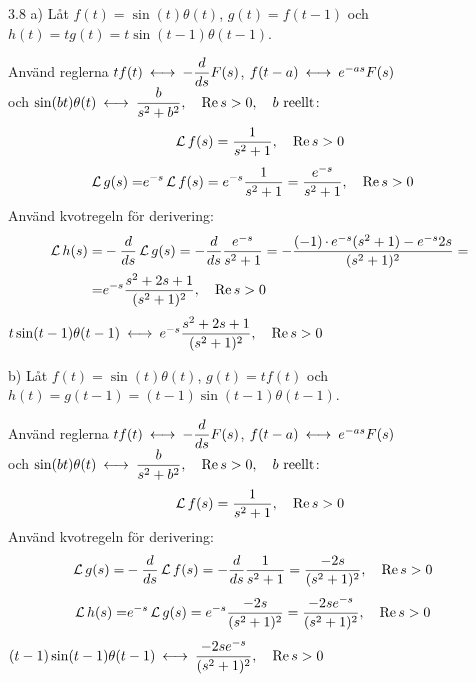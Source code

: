 \begin{task}{3.8 a)}
	Låt $f(t)=\sin(t)\theta(t)$, $g(t)=f(t-1)$ och $h(t)=tg(t)=t\sin(t-1)\theta(t-1)$.
	
	Använd reglerna $tf(t) \llra -\dfrac{d}{ds}F(s)$, $f(t-a)\llra e^{-as}F(s)$ \\
	och $\sin(bt)\theta(t)\llra\dfrac{b}{s^2+b^2}\cond{\Re s > 0}\cond{b\text{ reellt}}$:
	\[\operatorname{\mathcal{L}} f(s)=\frac{1}{s^2+1}, \quad \operatorname{Re} s > 0\]
	\begin{align*}
	\operatorname{\mathcal{L}} g(s)=
	&e^{-s}\operatorname{\mathcal{L}} f(s)=
	e^{-s}\frac{1}{s^2+1}=
	\frac{e^{-s}}{s^2+1}, \quad \operatorname{Re} s > 0
	\end{align*}
	Använd kvotregeln för derivering:
	\begin{align*}
	\operatorname{\mathcal{L}} h(s)=
	&-\frac{d}{ds}\operatorname{\mathcal{L}} g(s)=
	-\frac{d}{ds}\frac{e^{-s}}{s^2+1}=
	-\frac{(-1)\operatorname{\cdot}e^{-s}(s^2+1)-e^{-s}2s}{(s^2+1)^2}= \\ =
	&e^{-s}\frac{s^2+2s+1}{(s^2+1)^2}, \quad \operatorname{Re} s > 0
	\end{align*}
	\ans $t\sin(t-1)\theta(t-1) \llra e^{-s}\dfrac{s^2+2s+1}{(s^2+1)^2}\cond{\Re s > 0}$
\end{task}

\pagebreak
\begin{task}{b)}
	Låt $f(t)=\sin(t)\theta(t)$, $g(t)=tf(t)$ och $h(t)=g(t-1)=(t-1)\sin(t-1)\theta(t-1)$.
	
	Använd reglerna $tf(t) \llra -\dfrac{d}{ds}F(s)$, $f(t-a)\llra e^{-as}F(s)$ \\
	och $\sin(bt)\theta(t)\llra\dfrac{b}{s^2+b^2}\cond{\Re s > 0}\cond{b\text{ reellt}}$:
	\[\operatorname{\mathcal{L}} f(s)=\frac{1}{s^2+1}, \quad \operatorname{Re} s > 0\]
	Använd kvotregeln för derivering:
	\begin{align*}
	\operatorname{\mathcal{L}} g(s)=
	&-\frac{d}{ds}\operatorname{\mathcal{L}} f(s)=
	-\frac{d}{ds}\frac{1}{s^2+1}=
	\frac{-2s}{(s^2+1)^2}, \quad \operatorname{Re} s > 0
	\end{align*}
	\begin{align*}
	\operatorname{\mathcal{L}} h(s)=
	&e^{-s}\operatorname{\mathcal{L}} g(s)=
	e^{-s}\frac{-2s}{(s^2+1)^2}=
	\frac{-2se^{-s}}{(s^2+1)^2}, \quad \operatorname{Re} s > 0
	\end{align*}
	\ans $(t-1)\sin(t-1)\theta(t-1) \llra \dfrac{-2se^{-s}}{(s^2+1)^2}\cond{\Re s > 0}$
\end{task}